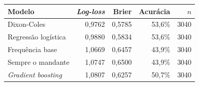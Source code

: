 \begin{tabular}{lrrrr}
  \toprule
  Modelo & \textit{Log-loss} & Brier & Acurácia & $n$ \\
  \midrule
  Dixon-Coles & 0,9762 & 0,5785 & 53,6\% & 3040 \\
  Regressão logística & 0,9880 & 0,5834 & 53,6\% & 3040 \\
  Frequência base & 1,0669 & 0,6457 & 43,9\% & 3040 \\
  Sempre o mandante & 1,0747 & 0,6500 & 43,9\% & 3040 \\
  \textit{Gradient boosting} & 1,0807 & 0,6257 & 50,7\% & 3040 \\
  \bottomrule
\end{tabular}
